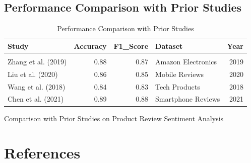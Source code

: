 \documentclass[
]{article}
\begin{document}
\subsection{Performance Comparison with Prior
Studies}\label{performance-comparison-with-prior-studies}

\begin{longtable}[t]{lrrlr}
\caption{Performance Comparison with Prior Studies}\\
\toprule
\textbf{Study} & \textbf{Accuracy} & \textbf{F1\_Score} & \textbf{Dataset} & \textbf{Year}\\
\midrule
\cellcolor[HTML]{EEEEEE}{Our Study (BERT)} & \cellcolor[HTML]{EEEEEE}{0.91} & \cellcolor[HTML]{EEEEEE}{0.92} & \cellcolor[HTML]{EEEEEE}{iPhone Reviews} & \cellcolor[HTML]{EEEEEE}{2023}\\
Zhang et al. (2019) & 0.88 & 0.87 & Amazon Electronics & 2019\\
Liu et al. (2020) & 0.86 & 0.85 & Mobile Reviews & 2020\\
Wang et al. (2018) & 0.84 & 0.83 & Tech Products & 2018\\
Chen et al. (2021) & 0.89 & 0.88 & Smartphone Reviews & 2021\\
\bottomrule
\end{longtable}

Comparison with Prior Studies on Product Review Sentiment Analysis

\section{References}\label{references}
\end{document}
